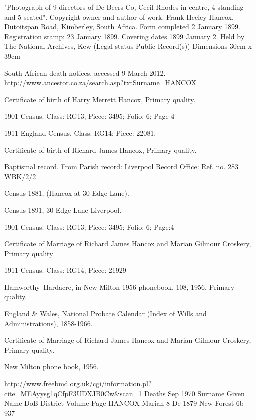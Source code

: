 \begin{thebibliography}{99}
	"Photograph of 9 directors of De Beers Co, Cecil Rhodes in centre, 4 standing and 5 seated".
	Copyright owner and author of work: Frank Heeley Hancox, Dutoitspan Road, Kimberley, South Africa.
	Form completed 2 January 1899. Registration stamp: 23 January 1899.
	Covering dates 1899 January 2. Held by The National Archives, Kew (Legal status Public Record(s))
	Dimensions 30cm x 39cm

	South African death notices, accessed 9 March 2012.
	\url{http://www.ancestor.co.za/search.asp?txtSurname=HANCOX}
	
	Certificate of birth of Harry Merrett Hancox, Primary quality.
	
	1901 Census. Class: RG13; Piece: 3495; Folio: 6; Page 4
	
	1911 England Census. Class: RG14; Piece: 22081.
	
	Certificate of birth of Richard James Hancox, Primary quality.

	 Baptismal record. From Parish record: Liverpool Record Office: Ref. no. 283 WBK/2/2
	 
	Census 1881, (Hancox at 30 Edge Lane).
	
	Census 1891, 30 Edge Lane Liverpool.

	1901 Census. Class: RG13; Piece: 3495; Folio: 6; Page:4

	 Certificate of Marriage of Richard James Hancox and Marian Gilmour Croskery, Primary quality
	 
	1911 Census. Class: RG14; Piece: 21929
	
	Hamworthy--Hardacre, in New Milton 1956 phonebook, 108, 1956, Primary quality.
	
	England \& Wales, National Probate Calendar (Index of Wills and Administrations), 1858-1966.
	 
	Certificate of Marriage of Richard James Hancox and Marian Gilmour Croskery, Primary quality.
	
	New Milton phone book, 1956. 
	
	\url{http://www.freebmd.org.uk/cgi/information.pl?cite=MEAyysg1qCfpF3UDXJB0Cw&scan=1}
	Deaths Sep 1970
	Surname     Given Name      DoB         District    Volume      Page    
	HANCOX      Marian          8 De 1879   New Forest  6b          937
	

\end{thebibliography}

